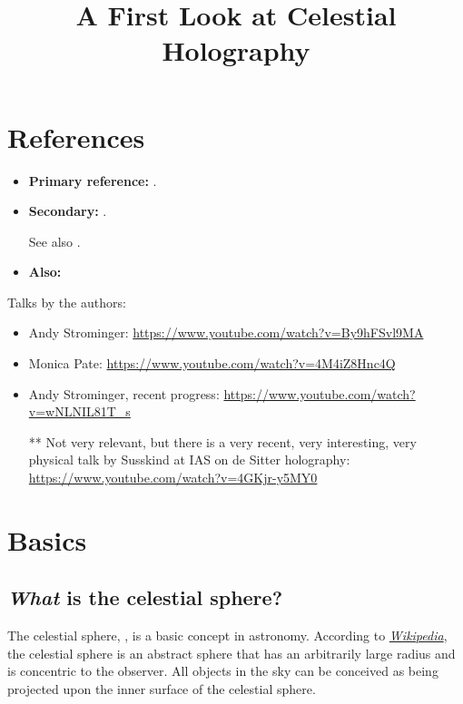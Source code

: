 \documentclass[a4paper
	,10pt
]{article}
\title{A First Look at Celestial Holography}
\begin{document}
\maketitle
{}
\thispagestyle{empty}


\setlength{\parskip}{.1\baselineskip}
\tableofcontents
\setlength{\parskip}{\parskipnorm}

\addtocounter{section}{-1}
\section{References}
	\begin{itemize}
	\item \textbf{Primary reference:} . 
	\item \textbf{Secondary:} . 
	
	See also . 
	\item \textbf{Also:} 
	\end{itemize}
	
	\noindent
	Talks by the authors:
	\begin{itemize}[noitemsep]
	\item Andy Strominger: \url{https://www.youtube.com/watch?v=By9hFSvl9MA}
	\item Monica Pate: \url{https://www.youtube.com/watch?v=4M4iZ8Hnc4Q}
	\item Andy Strominger, recent progress: \url{https://www.youtube.com/watch?v=wNLNIL81T_s}
	
	\vspace{.5\baselineskip}
	
	\item[**] Not very relevant, but there is a very recent, very interesting, very physical talk by Susskind at IAS on de Sitter holography: \url{https://www.youtube.com/watch?v=4GKjr-y5MY0}
	\end{itemize}

\pagebreak

\section{Basics}
\subsection{\textsl{What} is the celestial sphere?}
	The celestial sphere, , is a basic concept in astronomy. According to \href{https://en.wikipedia.org/wiki/Celestial_sphere}{\textsl{Wikipedia}}, the celestial sphere is an abstract sphere that has an arbitrarily large radius and is concentric to the observer. All objects in the sky can be conceived as being projected upon the inner surface of the celestial sphere. 
	
\end{document}
